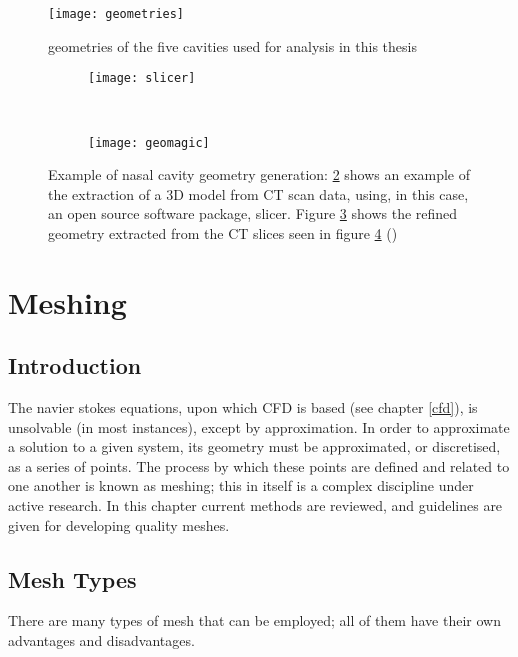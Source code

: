 \begin{figure} 
  \texttt{[image: geometries]}
  \caption{geometries of the five cavities used for analysis in this thesis}
  \label{fig:geo}

\end{figure}
\begin{figure}[t!]

  \begin{subfigure}[t]{0.5\textwidth} 
    \texttt{[image: slicer]}
    \caption{}
    \label{fig:slicer}
  \end{subfigure}%
  ~ %
  \begin{subfigure}[t]{0.5\textwidth} 
    \texttt{[image: geomagic]}
    \caption{}
    \label{fig:geomag}
  \end{subfigure}

  \caption{Example of nasal cavity geometry generation: \ref{fig:slicer} shows an example of the extraction of a 3D model from CT scan data, using, in this case, an open source software package, slicer. Figure \ref{fig:geomag} shows the refined geometry extracted from the CT slices seen in figure \ref{fig:cavzamp} ()}
  \label{fig:cavzamp}
\end{figure}
 
\section{Meshing} \label{Meshing}
\subsection{Introduction}

The navier stokes equations, upon which CFD is based (see chapter \ref{cfd}), is unsolvable (in most instances), except by approximation. In order to approximate a solution to a given system, its geometry must be approximated, or discretised, as a series of points. The process by which these points are defined and related to one another is known as meshing; this in itself is a complex discipline under active research. In this chapter current methods are reviewed, and guidelines are given for developing quality meshes.
\subsection{Mesh Types} \label{mtypes}

There are many types of mesh that can be employed; all of them have their own advantages and disadvantages. 

